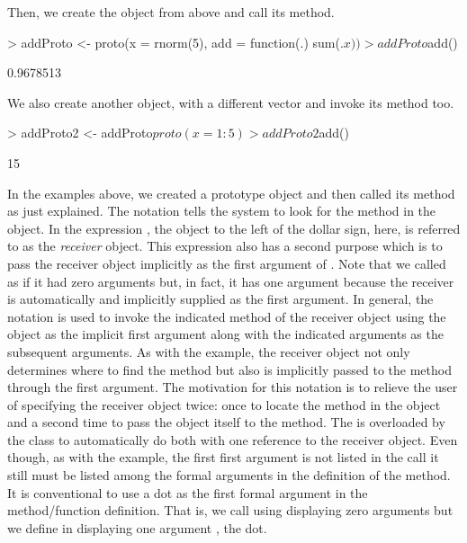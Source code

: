 \documentclass{Z}
\begin{document}
Then, we create the  object from above
and call its  method.
\begin{Schunk}
\begin{Sinput}
> addProto <- proto(x = rnorm(5), add = function(.) sum(.$x))
> addProto$add()
\end{Sinput}
\begin{Soutput}
[1] 0.9678513
\end{Soutput}
\end{Schunk}
We also create another object,  
with a different  vector and
invoke its  method too.
\begin{Schunk}
\begin{Sinput}
> addProto2 <- addProto$proto(x = 1:5)
> addProto2$add()
\end{Sinput}
\begin{Soutput}
[1] 15
\end{Soutput}
\end{Schunk}
In the examples above, we created a prototype object 
and then called its  method as just explained.  
The notation 
tells the system to look for the  method
in the  object.  In the expression ,
the  object to the left
of the dollar sign,  here, is referred to as the
\emph{receiver} object.  This expression
also has a second purpose which is to
pass the receiver object implicitly as the first argument of .
Note that we called  as if it had zero arguments but, in fact,
it has one argument because the receiver is automatically and implicitly
supplied as the first argument.  In general,
the notation  is
used to invoke the indicated method of the receiver object using the
object as the implicit first argument along with the indicated 
arguments as the subsequent arguments.  
As with the  example, the receiver
object not only determines where to find the
method but also is implicitly passed to the method through
the first argument.  The motivation for this notation
is to relieve the user of 
specifying the receiver object twice: 
once to locate the method in the object and a second
time to pass the object itself to the method.  
The \code{\$} is overloaded by the 
class to automatically do both with one reference to the receiver object.
Even though, as with the  example, the first
first argument is not listed in the call 
it still must be listed among the formal arguments
in the definition of the method.  It 
is conventional to use
a dot  as the first formal argument in the method/function
definition.  That is, we call  using 
displaying zero arguments
but we define  in  displaying
one argument , the dot.
\end{document}
